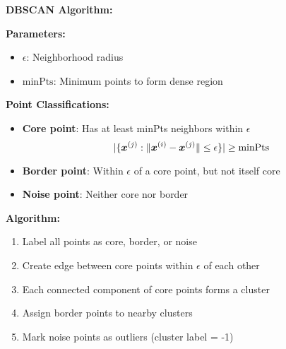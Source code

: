 \begin{seanbox}{4.3}
\textbf{DBSCAN Algorithm:}

\textbf{Parameters:}
\begin{itemize}
    \item $\epsilon$: Neighborhood radius
    \item $\text{minPts}$: Minimum points to form dense region
\end{itemize}

\textbf{Point Classifications:}

\begin{itemize}
    \item \textbf{Core point}: Has at least minPts neighbors within $\epsilon$
    \begin{equation}
        |\{\bm{x}^{(j)} : \|\bm{x}^{(i)} - \bm{x}^{(j)}\| \leq \epsilon\}| \geq \text{minPts}
    \end{equation}
    
    \item \textbf{Border point}: Within $\epsilon$ of a core point, but not itself core
    
    \item \textbf{Noise point}: Neither core nor border
\end{itemize}

\textbf{Algorithm:}

\begin{enumerate}
    \item Label all points as core, border, or noise
    \item Create edge between core points within $\epsilon$ of each other
    \item Each connected component of core points forms a cluster
    \item Assign border points to nearby clusters
    \item Mark noise points as outliers (cluster label = -1)
\end{enumerate}
\end{seanbox}

